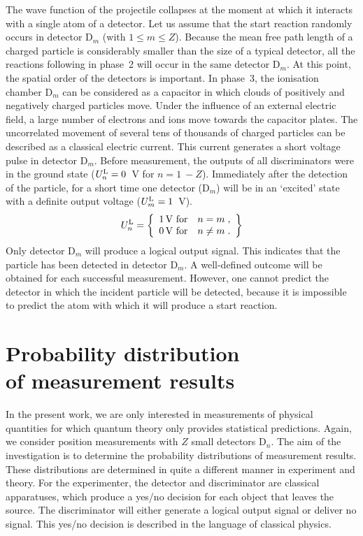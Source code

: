 \documentclass[11pt,a4paper]{article}
\begin{document}
The wave function of the projectile collapses at the moment at which it interacts with a single atom of a detector.  Let us assume that the start reaction randomly occurs in detector D$_m$ (with $1 \le m \le Z$).  
Because the mean free path length of a charged particle is considerably smaller than the size of a typical detector, all the reactions following in phase~2 will occur in the same detector D$_m$. At this point, the spatial order of the detectors is important.  
In phase~3, the ionisation chamber D$_m$ can be considered as a capacitor in which clouds of positively and negatively charged particles move.  
Under the influence of an external electric field, a large number of electrons and ions move towards the capacitor plates.  
The uncorrelated movement of several tens of thousands of charged particles can be described as a classical electric current.  
This current generates a short voltage pulse in detector D$_m$.  
Before measurement, the outputs of all discriminators were in the ground state ($U_n^{\rm L}=0$~V for $n=1~- Z$). Immediately after the detection of the particle, for a short time one detector (D$_m$) will be in an `excited' state with a definite output voltage ($U_m^{\rm L}=1$~V).    
%
\[ U_n^{\rm L} = \left\{ \begin{array}{rl} 1\,  \mbox{V for} & n=m \;, \\
0\,  \mbox{V for} &  n \ne m  \;. \end{array} \right\}    \]
%
Only detector D$_m$ will produce a logical output signal.  
This indicates that the particle has been detected in detector D$_m$.  
A well-defined outcome will be obtained for each successful measurement.  
However, one cannot predict the detector in which the incident particle will be detected, because it is impossible to predict the atom with which it will produce a start reaction.  


\section{Probability distribution \\ of measurement results}\label{ch_prob-dis}

In the present work, we are only interested in measurements of physical quantities for which quantum theory only provides statistical predictions.  
Again, we consider position measurements with $Z$ small detectors D$_n$.  
The aim of the investigation is to determine the probability distributions of measurement results.  These distributions are determined in quite a different manner in experiment and theory.  
For the experimenter, the detector and discriminator are classical apparatuses, which produce a yes/no decision for each object that leaves the source. The discriminator will either generate a logical output signal or deliver no signal.  This yes/no decision is described in the language of classical physics.  
\end{document}
